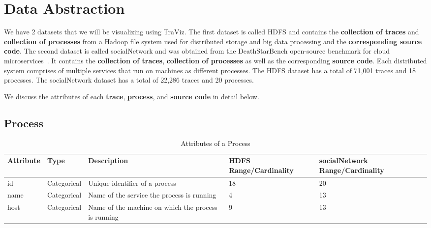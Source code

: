 \section{Data Abstraction}

We have 2 datasets that we will be visualizing using TraViz.
The first dataset is called HDFS and contains the \textbf{collection of traces} and \textbf{collection of processes}
from a Hadoop file system used for distributed storage 
and big data processing and the \textbf{corresponding source code}.
The second dataset is called socialNetwork and was obtained from the DeathStarBench open-source benchmark for cloud microservices~\cite{gan2019open}.
It contains the \textbf{collection of traces}, \textbf{collection of processes} as well as the corresponding \textbf{source code}.
Each distributed system comprises of multiple services that run on machines as different processes.
The HDFS dataset has a total of 71,001 traces and 18 processes.
The socialNetwork dataset has a total of 22,286 traces and 20 processes.

We discuss the attributes of each \textbf{trace}, \textbf{process}, and \textbf{source code} in detail below.

\subsection{Process}

\begin{table*}[]
  \centering
  \begin{adjustbox}{width=1\textwidth}
  \begin{tabular}{|l|l|l|l|l|}
  \hline
  Attribute & Type        & Description                                & HDFS Range/Cardinality & socialNetwork Range/Cardinality \\ \hline
  id        & Categorical & Unique identifier of a process             & 18                     & 20                              \\ \hline
  name      & Categorical & Name of the service the process is running & 4                      & 13                              \\ \hline
  host      & Categorical & Name of the machine on which the process is running & 9 & 13 \\ \hline
  \end{tabular}
\end{adjustbox}

\label{tab:process}
\caption{Attributes of a Process}
\end{table*}

